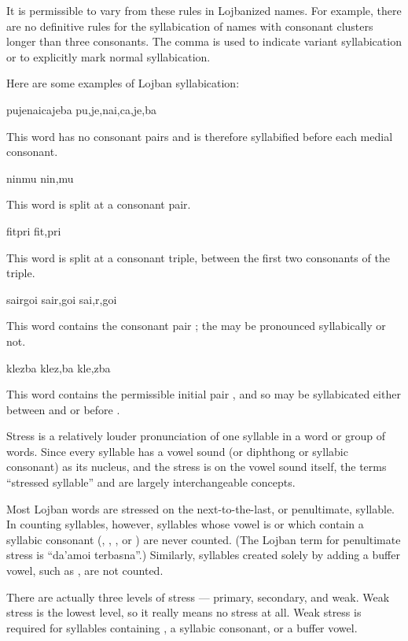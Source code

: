 It is permissible to vary from these rules in Lojbanized names. For example, there are no definitive rules for the syllabication of names with consonant clusters longer than three consonants. The comma is used to indicate variant syllabication or to explicitly mark normal syllabication.

Here are some examples of Lojban syllabication:
\begin{example}
pujenaicajeba\n
pu,je,nai,ca,je,ba
\end{example}

This word has no consonant pairs and is therefore syllabified before each medial consonant.
\begin{example}
ninmu\n
nin,mu
\end{example}

This word is split at a consonant pair.
\begin{example}
fitpri\n
fit,pri
\end{example}

This word is split at a consonant triple, between the first two consonants of the triple.
\begin{example}
sairgoi\n
sair,goi\n
sai,r,goi
\end{example}

This word contains the consonant pair ; the  may be pronounced syllabically or not.
\begin{example}
klezba\n
klez,ba\n
kle,zba
\end{example}

This word contains the permissible initial pair , and so may be syllabicated either between  and  or before .

Stress is a relatively louder pronunciation of one syllable in a word or group of words. Since every syllable has a vowel sound (or diphthong or syllabic consonant) as its nucleus, and the stress is on the vowel sound itself, the terms ``stressed syllable'' and  are largely interchangeable concepts.

Most Lojban words are stressed on the next-to-the-last, or penultimate, syllable. In counting syllables, however, syllables whose vowel is  or which contain a syllabic consonant (, , , or ) are never counted. (The Lojban term for penultimate stress is ``da'amoi terbasna''.) Similarly, syllables created solely by adding a buffer vowel, such as , are not counted.

There are actually three levels of stress --- primary, secondary, and weak. Weak stress is the lowest level, so it really means no stress at all. Weak stress is required for syllables containing , a syllabic consonant, or a buffer vowel.

